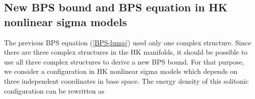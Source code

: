 \documentclass[a4paper,12pt]{article}
\begin{document}
\subsection{New BPS bound and BPS equation in HK nonlinear sigma models}
The previous \coordHE{} BPS equation (\ref{BPS-lump}) used only one complex 
structure. 
Since there are three complex structures in the HK manifolds, it should be 
possible to use all three complex structures to derive a new BPS bound. 
 For that purpose, we consider a configuration in \coordHE{} HK nonlinear 
 sigma models which depends on three 
independent coordinates \coordHE{} in base space. 
The energy density of this solitonic configuration can be rewritten as 
\end{document}
